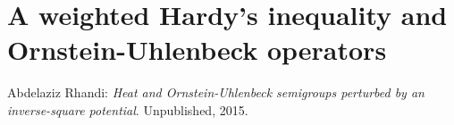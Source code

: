 \documentclass{mywork}
\begin{document}
\section{A weighted Hardy's inequality and Ornstein-Uhlenbeck operators}

\begin{thebibliography}{tief}
 Abdelaziz Rhandi: {\it Heat and Ornstein-Uhlenbeck semigroups perturbed by an inverse-square potential}. 
                     Unpublished, 2015.
\end{thebibliography} 
\end{document}
